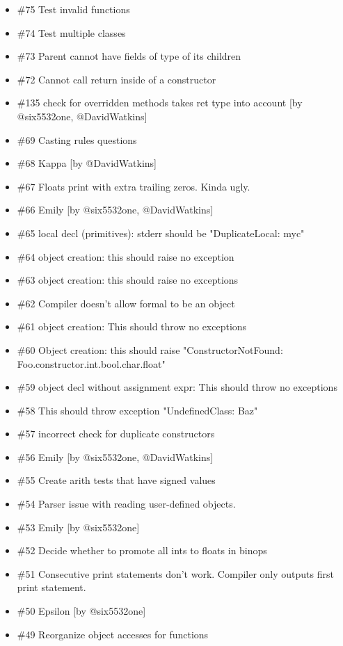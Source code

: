 \begin{homeworkProblem}
\begin{itemize}
		\item \#75 Test invalid functions
		\item \#74 Test multiple classes
		\item \#73 Parent cannot have fields of type of its children
		\item \#72 Cannot call return inside of a constructor
		\item \#135 check for overridden methods takes ret type into account [by @six5532one, @DavidWatkins]
		\item \#69 Casting rules questions
		\item \#68 Kappa [by @DavidWatkins]
		\item \#67 Floats print with extra trailing zeros. Kinda ugly.
		\item \#66 Emily [by @six5532one, @DavidWatkins]
		\item \#65 local decl (primitives): stderr should be "DuplicateLocal: myc"
		\item \#64 object creation: this should raise no exception
		\item \#63 object creation: this should raise no exceptions
		\item \#62 Compiler doesn't allow formal to be an object
		\item \#61 object creation: This should throw no exceptions
		\item \#60 Object creation: this should raise "ConstructorNotFound: Foo.constructor.int.bool.char.float"
		\item \#59 object decl without assignment expr: This should throw no exceptions
		\item \#58 This should throw exception "UndefinedClass: Baz"
		\item \#57 incorrect check for duplicate constructors
		\item \#56 Emily [by @six5532one, @DavidWatkins]
		\item \#55 Create arith tests that have signed values
		\item \#54 Parser issue with reading user-defined objects.
		\item \#53 Emily [by @six5532one]
		\item \#52 Decide whether to promote all ints to floats in binops
		\item \#51 Consecutive print statements don't work. Compiler only outputs first print statement.
		\item \#50 Epsilon [by @six5532one]
		\item \#49 Reorganize object accesses for functions

\end{itemize}
\end{homeworkProblem}
